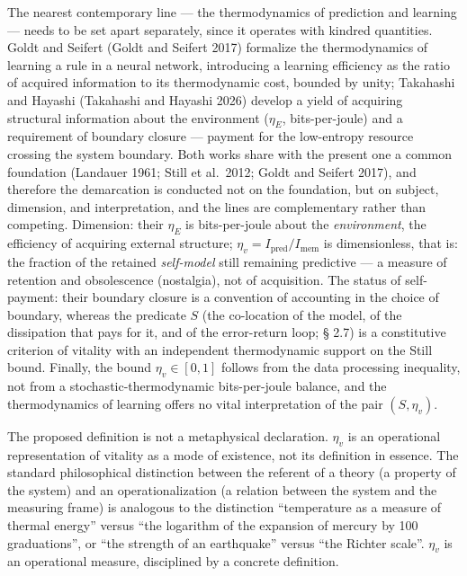 \documentclass[pdflatex,sn-mathphys-ay]{sn-jnl}
\begin{document}
The nearest contemporary line --- the thermodynamics of prediction and learning --- needs to be set apart separately, since it operates with kindred quantities. Goldt and Seifert (Goldt and Seifert 2017) formalize the thermodynamics of learning a rule in a neural network, introducing a learning efficiency as the ratio of acquired information to its thermodynamic cost, bounded by unity; Takahashi and Hayashi (Takahashi and Hayashi 2026) develop a yield of acquiring structural information about the environment (\(\eta_E\), bits-per-joule) and a requirement of boundary closure --- payment for the low-entropy resource crossing the system boundary. Both works share with the present one a common foundation (Landauer 1961; Still et al.~2012; Goldt and Seifert 2017), and therefore the demarcation is conducted not on the foundation, but on subject, dimension, and interpretation, and the lines are complementary rather than competing. Dimension: their \(\eta_E\) is bits-per-joule about the \emph{environment}, the efficiency of acquiring external structure; \(\eta_v = I_{\text{pred}}/I_{\text{mem}}\) is dimensionless, that is: the fraction of the retained \emph{self-model} still remaining predictive --- a measure of retention and obsolescence (nostalgia), not of acquisition. The status of self-payment: their boundary closure is a convention of accounting in the choice of boundary, whereas the predicate \(S\) (the co-location of the model, of the dissipation that pays for it, and of the error-return loop; § 2.7) is a constitutive criterion of vitality with an independent thermodynamic support on the Still bound. Finally, the bound \(\eta_v \in [0, 1]\) follows from the data processing inequality, not from a stochastic-thermodynamic bits-per-joule balance, and the thermodynamics of learning offers no vital interpretation of the pair \((S, \eta_v)\).

The proposed definition is not a metaphysical declaration. \(\eta_v\) is an operational representation of vitality as a mode of existence, not its definition in essence. The standard philosophical distinction between the referent of a theory (a property of the system) and an operationalization (a relation between the system and the measuring frame) is analogous to the distinction ``temperature as a measure of thermal energy'' versus ``the logarithm of the expansion of mercury by 100 graduations'', or ``the strength of an earthquake'' versus ``the Richter scale''. \(\eta_v\) is an operational measure, disciplined by a concrete definition.
\end{document}
